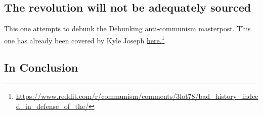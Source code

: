 \subsection{The revolution will not be adequately sourced}
This one attempts to debunk the Debunking anti-communism masterpost. This one has already been covered by Kyle Joseph \href{https://www.reddit.com/r/communism/comments/3lot78/bad_history_indeed_in_defense_of_the/}{here.}\footnote{\url{https://www.reddit.com/r/communism/comments/3lot78/bad_history_indeed_in_defense_of_the/}}

\subsection*{In Conclusion}

